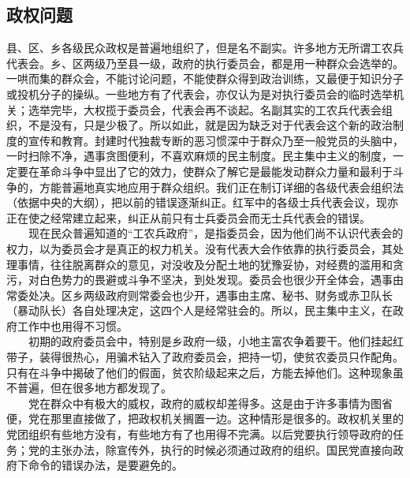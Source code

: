 \documentclass[cn,11pt,chinese]{elegantbook}
\def\myformat#1{\hfil\hfil #1}
\begin{document}
\subsection*{\myformat{政权问题}}
县、区、乡各级民众政权是普遍地组织了，但是名不副实。许多地方无所谓工农兵代表会。乡、区两级乃至县一级，政府的执行委员会，都是用一种群众会选举的。一哄而集的群众会，不能讨论问题，不能使群众得到政治训练，又最便于知识分子或投机分子的操纵。一些地方有了代表会，亦仅认为是对执行委员会的临时选举机关；选举完毕，大权揽于委员会，代表会再不谈起。名副其实的工农兵代表会组织，不是没有，只是少极了。所以如此，就是因为缺乏对于代表会这个新的政治制度的宣传和教育。封建时代独裁专断的恶习惯深中于群众乃至一般党员的头脑中，一时扫除不净，遇事贪图便利，不喜欢麻烦的民主制度。民主集中主义的制度，一定要在革命斗争中显出了它的效力，使群众了解它是最能发动群众力量和最利于斗争的，方能普遍地真实地应用于群众组织。我们正在制订详细的各级代表会组织法（依据中央的大纲），把以前的错误逐渐纠正。红军中的各级士兵代表会议，现亦正在使之经常建立起来，纠正从前只有士兵委员会而无士兵代表会的错误。\\
　　现在民众普遍知道的“工农兵政府”，是指委员会，因为他们尚不认识代表会的权力，以为委员会才是真正的权力机关。没有代表大会作依靠的执行委员会，其处理事情，往往脱离群众的意见，对没收及分配土地的犹豫妥协，对经费的滥用和贪污，对白色势力的畏避或斗争不坚决，到处发现。委员会也很少开全体会，遇事由常委处决。区乡两级政府则常委会也少开，遇事由主席、秘书、财务或赤卫队长（暴动队长）各自处理决定，这四个人是经常驻会的。所以，民主集中主义，在政府工作中也用得不习惯。\\
　　初期的政府委员会中，特别是乡政府一级，小地主富农争着要干。他们挂起红带子，装得很热心，用骗术钻入了政府委员会，把持一切，使贫农委员只作配角。只有在斗争中揭破了他们的假面，贫农阶级起来之后，方能去掉他们。这种现象虽不普遍，但在很多地方都发现了。\\
　　党在群众中有极大的威权，政府的威权却差得多。这是由于许多事情为图省便，党在那里直接做了，把政权机关搁置一边。这种情形是很多的。政权机关里的党团组织有些地方没有，有些地方有了也用得不完满。以后党要执行领导政府的任务；党的主张办法，除宣传外，执行的时候必须通过政府的组织。国民党直接向政府下命令的错误办法，是要避免的。\\
\end{document}
